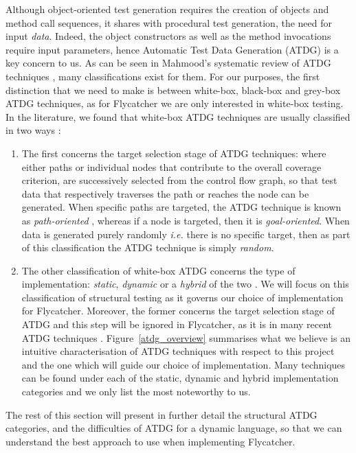 Although object-oriented test generation requires the creation of objects and method call sequences, it shares with procedural test generation, the need for input \emph{data}. Indeed, the object constructors as well as the method invocations require input parameters, hence Automatic Test Data Generation (ATDG) is a key concern to us. As can be seen in Mahmood's systematic review of ATDG techniques \cite{mahmood2007systematic}, many classifications exist for them. For our purposes, the first distinction that we need to make is between white-box, black-box \cite{prasanna2005survey} and grey-box ATDG techniques, as for \textsf{Flycatcher} we are only interested in white-box testing. In the literature, we found that white-box ATDG techniques are usually classified in two ways \cite{mahmood2007systematic, edvardsson1999survey, tahbildar2automated}:
\begin{enumerate}
   \item The first concerns the target selection stage of ATDG techniques: where either paths or individual nodes that contribute to the overall coverage criterion, are successively selected from the control flow graph, so that test data that respectively traverses the path or reaches the node can be generated. When specific paths are targeted, the ATDG technique is known as \emph{path-oriented} \cite{edvardsson1999survey}, whereas if a node is targeted, then it is \emph{goal-oriented}. When data is generated purely randomly \emph{i.e.} there is no specific target, then as part of this classification the ATDG technique is simply \emph{random}.
   \item The other classification of white-box ATDG concerns the type of implementation: \emph{static}, \emph{dynamic} or a \emph{hybrid} of the two \cite{han2008empirical, mcminn2004search}. We will focus on this classification of structural testing as it governs our choice of implementation for \textsf{Flycatcher}. Moreover, the former concerns the target selection stage of ATDG and this step will be ignored in \textsf{Flycatcher}, as it is in many recent ATDG techniques \cite{tahbildar2automated}. Figure~\ref{atdg_overview} summarises what we believe is an intuitive characterisation of ATDG techniques with respect to this project and the one which will guide our choice of implementation. Many techniques can be found under each of the static, dynamic and hybrid implementation categories and we only list the most noteworthy to us.
\end{enumerate}

The rest of this section will present in further detail the structural ATDG categories, and the difficulties of ATDG for a dynamic language, so that we can understand the best approach to use when implementing \textsf{Flycatcher}.


